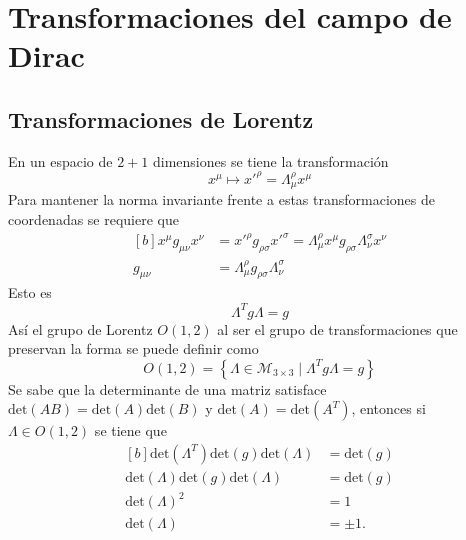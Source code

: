 \section{Transformaciones del campo de Dirac}
\subsection{Transformaciones de Lorentz}
En un espacio de $2+1$ dimensiones se tiene la transformación
\begin{equation}
	x^{\mu} \longmapsto x'^{\rho}=\Lambda^{\rho}_\mu x^{\mu}
\end{equation}
Para mantener la norma invariante frente a estas transformaciones de coordenadas se requiere que
\begin{equation}
	\begin{aligned}[b]
		x^{\mu}g_{\mu\nu}x^{\nu} & = x'^{\rho}g_{\rho\sigma}x'^{\sigma} = \Lambda^{\rho}_\mu x^{\mu}g_{\rho\sigma}\Lambda^{\sigma}_\nu x^{\nu} \\
		g_{\mu\nu}               & = \Lambda_\mu^{\rho}g_{\rho\sigma}\Lambda_\nu^{\sigma}
	\end{aligned}
\end{equation}
Esto es
\begin{equation}
	\Lambda^{T}g\Lambda = g
\end{equation}
Así el grupo de Lorentz $O(1,2)$ al ser el grupo de transformaciones que preservan la forma se puede definir como
\begin{equation}
	O(1,2) = \left\{\Lambda \in \mathcal{M}_{3\times3}\mid \Lambda^{T}g\Lambda = g\right\}
\end{equation}
Se sabe que la determinante de una matriz satisface $\text{det}(AB) = \text{det}(A)\text{det}(B)$ y $\text{det}(A) = \text{det}(A^T)$, entonces si $\Lambda \in O(1,2)$ se tiene que
\begin{equation}
	\begin{aligned}[b]
		\text{det}(\Lambda^T) \text{det}(g) \text{det}(\Lambda) & = \text{det}(g) \\
		\text{det}(\Lambda) \text{det}(g) \text{det}(\Lambda)   & = \text{det}(g) \\
		\text{det}(\Lambda)^2                                   & = 1             \\
		\text{det}(\Lambda)                                     & = \pm 1.
	\end{aligned}
\end{equation}
